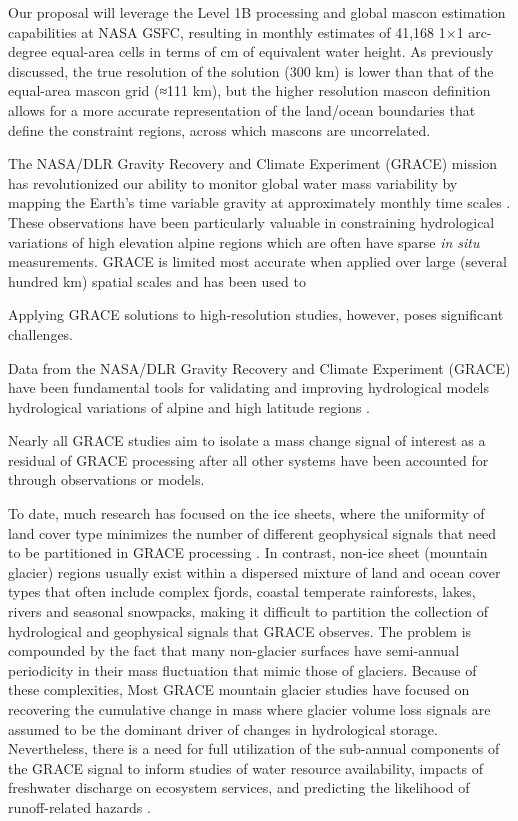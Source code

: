 \documentclass[review,oneside]{igs}
\begin{document}
Our proposal will leverage the Level 1B processing and global mascon estimation capabilities at NASA GSFC, resulting in monthly estimates of 41,168 1×1 arc-degree equal-area cells in terms of cm of equivalent water height. As previously discussed, the true resolution of the solution (300 km) is lower than that of the equal-area mascon grid (≈111 km), but the higher resolution mascon definition allows for a more accurate representation of the land/ocean boundaries that define the constraint regions, across which mascons are uncorrelated.





The NASA/DLR Gravity Recovery and Climate Experiment (GRACE) mission has revolutionized our ability to monitor global water mass variability by mapping the Earth’s time variable gravity at approximately monthly time scales \citep{wouters_grace_2014}. These observations have been particularly valuable in constraining hydrological variations of high elevation alpine regions which are often have sparse \textit{in situ} measurements. GRACE is limited most accurate when applied over large (several hundred km) spatial scales and has been used to  


Applying GRACE solutions to high-resolution studies, however, poses significant challenges.

Data from the NASA/DLR Gravity Recovery and Climate Experiment (GRACE) have been fundamental tools for validating and improving hydrological models hydrological variations of alpine and high latitude regions \citep{wouters_grace_2014}. 

Nearly all GRACE studies aim to isolate a mass change signal of interest as a residual of GRACE processing after all other systems have been accounted for through observations or models.

 To date, much research has focused on the ice sheets, where the uniformity of land cover type minimizes the number of different geophysical signals that need to be partitioned in GRACE processing \citep{shepherd_reconciled_2012}. In contrast, non-ice sheet (mountain glacier) regions usually exist within a dispersed mixture of land and ocean cover types that often include complex fjords, coastal temperate rainforests, lakes, rivers and seasonal snowpacks, making it difficult to partition the collection of hydrological and geophysical signals that GRACE observes. The problem is compounded by the fact that many non-glacier surfaces have semi-annual periodicity in their mass fluctuation that mimic those of glaciers. Because of these complexities, Most GRACE mountain glacier studies have focused on recovering the cumulative change in mass \citep{reager_decade_2016} where glacier volume loss signals are assumed to be the dominant driver of changes in hydrological storage. Nevertheless, there is a need for full utilization of the sub-annual components of the GRACE signal to inform studies of water resource availability, impacts of freshwater discharge on ecosystem services, and predicting the likelihood of runoff-related hazards \citep{oneel_icefield--ocean_2015}.
\end{document}
